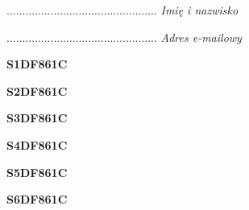 \begin{turn}{90}\begin{minipage}{\linewidth} \vspace{20mm} ................................................  \textit{Imię i nazwisko}\end{minipage}\end{turn}

\begin{turn}{90}\begin{minipage}{\linewidth} \vspace{20mm} ................................................  \textit{Adres e-mailowy}\end{minipage}\end{turn}

\begin{turn}{90}\huge \begin{minipage}{\linewidth} \vspace{10mm}\textbf{S1DF861C}\end{minipage}\end{turn}

\begin{turn}{90}\huge \begin{minipage}{\linewidth} \vspace{10mm}\textbf{S2DF861C}\end{minipage}\end{turn}

\begin{turn}{90}\huge \begin{minipage}{\linewidth} \vspace{10mm}\textbf{S3DF861C}\end{minipage}\end{turn}

\begin{turn}{90}\huge \begin{minipage}{\linewidth} \vspace{10mm}\textbf{S4DF861C}\end{minipage}\end{turn}

\begin{turn}{90}\huge \begin{minipage}{\linewidth} \vspace{10mm}\textbf{S5DF861C}\end{minipage}\end{turn}

\begin{turn}{90}\huge \begin{minipage}{\linewidth} \vspace{10mm}\textbf{S6DF861C}\end{minipage}\end{turn}

